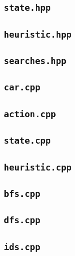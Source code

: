 \documentclass[12pt, a4paper]{article}
\begin{document}
\subsection{{\tt state.hpp}}


\subsection{{\tt heuristic.hpp}}


\subsection{{\tt searches.hpp}}


\subsection{{\tt car.cpp}}


\subsection{{\tt action.cpp}}


\subsection{{\tt state.cpp}}


\subsection{{\tt heuristic.cpp}}


\subsection{{\tt bfs.cpp}}


\subsection{{\tt dfs.cpp}}


\subsection{{\tt ids.cpp}}

\end{document}
